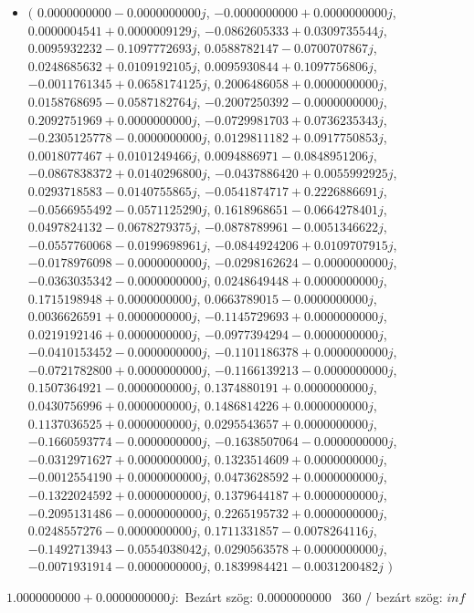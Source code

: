\documentclass[14pt,a4paper]{article}
\begin{document}
\begin{itemize}
\item
$\big($
$0.0000000000-0.0000000000j$, $-0.0000000000+0.0000000000j$, $0.0000004541+0.0000009129j$, $-0.0862605333+0.0309735544j$, $0.0095932232-0.1097772693j$, $0.0588782147-0.0700707867j$, $0.0248685632+0.0109192105j$, $0.0095930844+0.1097756806j$, $-0.0011761345+0.0658174125j$, $0.2006486058+0.0000000000j$, $0.0158768695-0.0587182764j$, $-0.2007250392-0.0000000000j$, $0.2092751969+0.0000000000j$, $-0.0729981703+0.0736235343j$, $-0.2305125778-0.0000000000j$, $0.0129811182+0.0917750853j$, $0.0018077467+0.0101249466j$, $0.0094886971-0.0848951206j$, $-0.0867838372+0.0140296800j$, $-0.0437886420+0.0055992925j$, $0.0293718583-0.0140755865j$, $-0.0541874717+0.2226886691j$, $-0.0566955492-0.0571125290j$, $0.1618968651-0.0664278401j$, $0.0497824132-0.0678279375j$, $-0.0878789961-0.0051346622j$, $-0.0557760068-0.0199698961j$, $-0.0844924206+0.0109707915j$, $-0.0178976098-0.0000000000j$, $-0.0298162624-0.0000000000j$, $-0.0363035342-0.0000000000j$, $0.0248649448+0.0000000000j$, $0.1715198948+0.0000000000j$, $0.0663789015-0.0000000000j$, $0.0036626591+0.0000000000j$, $-0.1145729693+0.0000000000j$, $0.0219192146+0.0000000000j$, $-0.0977394294-0.0000000000j$, $-0.0410153452-0.0000000000j$, $-0.1101186378+0.0000000000j$, $-0.0721782800+0.0000000000j$, $-0.1166139213-0.0000000000j$, $0.1507364921-0.0000000000j$, $0.1374880191+0.0000000000j$, $0.0430756996+0.0000000000j$, $0.1486814226+0.0000000000j$, $0.1137036525+0.0000000000j$, $0.0295543657+0.0000000000j$, $-0.1660593774-0.0000000000j$, $-0.1638507064-0.0000000000j$, $-0.0312971627+0.0000000000j$, $0.1323514609+0.0000000000j$, $-0.0012554190+0.0000000000j$, $0.0473628592+0.0000000000j$, $-0.1322024592+0.0000000000j$, $0.1379644187+0.0000000000j$, $-0.2095131486-0.0000000000j$, $0.2265195732+0.0000000000j$, $0.0248557276-0.0000000000j$, $0.1711331857-0.0078264116j$, $-0.1492713943-0.0554038042j$, $0.0290563578+0.0000000000j$, $-0.0071931914-0.0000000000j$, $0.1839984421-0.0031200482j$
$\big)$
\end{itemize}
$1.0000000000+0.0000000000j$:\
Bezárt szög: $0.0000000000$ \
360 / bezárt szög: $inf$\
\end{document}
